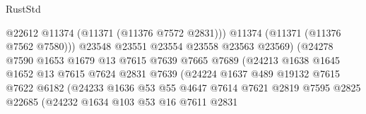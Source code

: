 \begin{lexlean}{RustStd}
\begin{coremodule}
                                          @22612
                                          @11374
                                          (@11371 (@11376 @7572 @2831)))
                                        @11374
                                        (@11371 (@11376 @7562 @7580)))
                                      @23548
                                      @23551
                                      @23554
                                      @23558
                                      @23563
                                      @23569)
                                    (@24278
                                      @7590
                                      @1653
                                      @1679
                                      @13
                                      @7615
                                      @7639
                                      @7665
                                      @7689
                                      (@24213
                                        @1638
                                        @1645
                                        @1652
                                        @13
                                        @7615
                                        @7624
                                        @2831
                                        @7639
                                        (@24224
                                          @1637
                                          @489
                                          @19132
                                          @7615
                                          @7622
                                          @6182
                                          (@24233
                                            @1636
                                            @53
                                            @55
                                            @4647
                                            @7614
                                            @7621
                                            @2819
                                            @7595
                                            @2825
                                            @22685
                                            (@24232
                                              @1634
                                              @103
                                              @53
                                              @16
                                              @7611
                                              @2831

\end{coremodule}
\end{lexlean}
